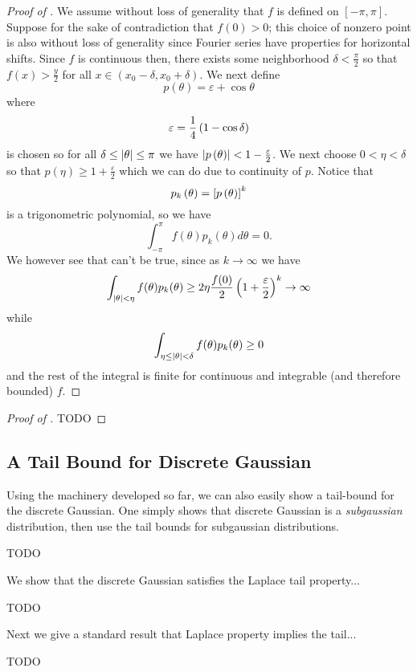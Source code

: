 \documentclass{article}
\begin{document}
\begin{proof}[Proof of ]
	We assume without loss of generality that $f$ is defined on $[-\pi, \pi]$.
	Suppose for the sake of contradiction that $f(0)>0$; this choice of nonzero point is also without loss of generality since Fourier series have properties for horizontal shifts.
	Since $f$ is continuous then, there exists some neighborhood $\delta<\frac{\pi}{2}$ so that $f(x)>\frac{y}{2}$ for all $x\in(x_0 - \delta, x_0 + \delta)$.
	We next define
	\begin{equation}
		p(\theta)=\varepsilon+\cos\theta
	\end{equation}
	where
	$$\varepsilon=\frac{1}{4}\left(1-\cos\delta\right)$$
	is chosen so for all $\delta\leq\abs{\theta}\leq\pi$ we have $\abs{p\left(\theta\right)}<1-\frac{\varepsilon}{2}$.
	We next choose $0<\eta<\delta$ so that $p(\eta)\geq 1 +\frac{\varepsilon}{2}$ which we can do due to continuity of $p$.
	Notice that
	$$p_k\left(\theta\right)=\left[p\left(\theta\right)\right]^k$$
	is a trigonometric polynomial, so we have
	\begin{equation*}
		\int_{-\pi}^\pi f(\theta) p_k(\theta)d\theta = 0.
	\end{equation*}
	We however see that can't be true, since as $k\rightarrow\infty$ we have
	\begin{equation*}
		\int_{\abs{\theta}<\eta}f(\theta)p_k(\theta)\geq 2\eta\frac{f(0)}{2}\left(1+\frac{\varepsilon}{2}\right)^k\rightarrow\infty
	\end{equation*}
	while
	\begin{equation*}
		\int_{\eta\leq\abs{\theta}<\delta}f(\theta)p_k(\theta)\geq 0
	\end{equation*}
	and the rest of the integral is finite for continuous and integrable (and therefore bounded) $f$.
\end{proof}

\begin{proof}[Proof of ]
TODO
\end{proof}

\subsection{A Tail Bound for Discrete Gaussian}

Using the machinery developed so far,
we can also easily show a tail-bound for the discrete Gaussian.
One simply shows that discrete Gaussian is a \emph{subgaussian} distribution,
then use the tail bounds for subgaussian distributions.

\begin{definition}
	TODO
\end{definition}

We show that the discrete Gaussian satisfies the Laplace tail  property...
\begin{lemma}
	TODO
\end{lemma}

Next we give a standard result that Laplace property implies the tail...
\begin{lemma}
	TODO
\end{lemma}



\end{document}
